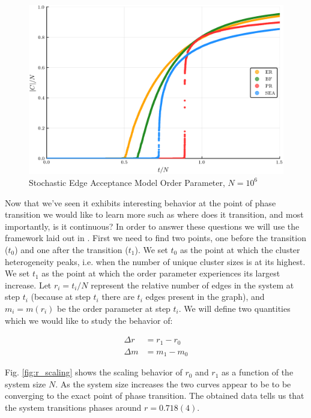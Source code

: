 \begin{figure}[H]
	\centering
	\includegraphics[width=350pt, clip]{images/Network_ER_BF_PR_SEA_1e6_order_param.png}
	\caption{Stochastic Edge Acceptance Model Order Parameter, $N = 10^6$}
	\label{fig:ER_BF_PR_SEA_transition}
\end{figure}

Now that we've seen it exhibits interesting behavior at the point of phase transition we would like to learn more such as where does it transition, and most importantly, is it continuous?
In order to answer these questions we will use the framework laid out in \cite{Lee_1}.
First we need to find two points, one before the transition ($t_0$) and one after the transition ($t_1$).
We set $t_0$ as the point at which the cluster heterogeneity peaks, i.e. when the number of unique cluster sizes is at its highest.
We set $t_1$ as the point at which the order parameter experiences its largest increase.
Let $r_i = t_i / N$ represent the relative number of edges in the system at step $t_i$ (because at step $t_i$ there are $t_i$ edges present in the graph), and $m_i = m(r_i)$ be the order parameter at step $t_i$.
We will define two quantities which we would like to study the behavior of:

\begin{equation}
\begin{split}
	\Delta r &= r_1 - r_0 \\
	\Delta m &= m_1 - m_0
\end{split}
\end{equation}

Fig. \ref{fig:r_scaling} shows the scaling behavior of $r_0$ and $r_1$ as a function of the system size $N$.
As the system size increases the two curves appear to be to be converging to the exact point of phase transition.
The obtained data tells us that the system transitions phases around $r = 0.718(4)$.

